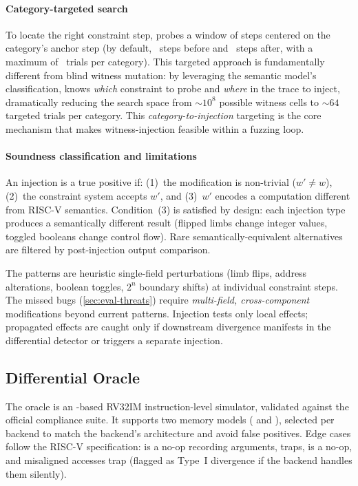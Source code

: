 \paragraph{Category-targeted search}
To locate the right constraint step, \tool probes a window of steps centered on the category's anchor step (by default, ~steps before and ~steps after, with a maximum of ~trials per category). This targeted approach is fundamentally different from blind witness mutation: by leveraging the semantic model's classification, \tool knows \emph{which} constraint to probe and \emph{where} in the trace to inject, dramatically reducing the search space from $\sim$$10^8$ possible witness cells to $\sim$$64$ targeted trials per category. This \emph{category-to-injection} targeting is the core mechanism that makes witness-injection feasible within a fuzzing loop.


\paragraph{Soundness classification and limitations}
An injection is a true positive if: (1)~the modification is non-trivial ($w' \neq w$), (2)~the constraint system accepts $w'$, and (3)~$w'$ encodes a computation different from RISC-V semantics. Condition~(3) is satisfied by design: each injection type produces a semantically different result (flipped limbs change integer values, toggled booleans change control flow). Rare semantically-equivalent alternatives are filtered by post-injection output comparison.

The patterns are heuristic single-field perturbations (limb flips, address alterations, boolean toggles, $2^n$ boundary shifts) at individual constraint steps. The  missed bugs (\autoref{sec:eval-threats}) require \emph{multi-field, cross-component} modifications beyond current patterns. Injection tests only local effects; propagated effects are caught only if downstream divergence manifests in the differential detector or triggers a separate injection.

\subsection{Differential Oracle}\label{sec:oracle}

The oracle is an -based RV32IM instruction-level simulator, validated against the official  compliance suite. It supports two memory models ( and ), selected per backend to match the backend's architecture and avoid false positives. Edge cases follow the RISC-V specification:  is a no-op recording arguments,  traps,  is a no-op, and misaligned accesses trap (flagged as Type~I divergence if the backend handles them silently).

